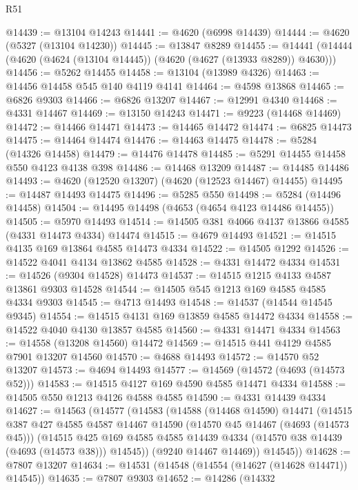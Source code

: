 \begin{lexlean}{R51}
\begin{coremodule}
@14439 := @13104 @14243
@14441 := @4620 (@6998 @14439)
@14444 := @4620 (@5327 (@13104 @14230))
@14445 := @13847 @8289
@14455 := @14441 (@14444 (@4620 (@4624 (@13104 @14445)) (@4620 (@4627 (@13933 @8289)) @4630)))
@14456 := @5262 @14455
@14458 := @13104 (@13989 @4326)
@14463 := @14456 @14458 @545 @140 @4119 @4141
@14464 := @4598 @13868
@14465 := @6826 @9303
@14466 := @6826 @13207
@14467 := @12991 @4340
@14468 := @4331 @14467
@14469 := @13150 @14243
@14471 := @9223 (@14468 @14469)
@14472 := @14466 @14471
@14473 := @14465 @14472
@14474 := @6825 @14473
@14475 := @14464 @14474
@14476 := @14463 @14475
@14478 := @5284 (@14326 @14458)
@14479 := @14476 @14478
@14485 := @5291 @14455 @14458 @550 @4123 @4138 @398
@14486 := @14468 @13209
@14487 := @14485 @14486
@14493 := @4620 (@12520 @13207) (@4620 (@12523 @14467) @14455)
@14495 := @14487 @14493 @14475
@14496 := @5285 @550
@14498 := @5284 (@14496 @14458)
@14504 := @14495 @14498 (@4653 (@4654 @4123 @14486 @14455))
@14505 := @5970 @14493
@14514 := @14505 @381 @4066 @4137 @13866 @4585 (@4331 @14473 @4334) @14474
@14515 := @4679 @14493
@14521 := @14515 @4135 @169 @13864 @4585 @14473 @4334
@14522 := @14505 @1292
@14526 := @14522 @4041 @4134 @13862 @4585
@14528 := @4331 @14472 @4334
@14531 := @14526 (@9304 @14528) @14473
@14537 := @14515 @1215 @4133 @4587 @13861 @9303 @14528
@14544 := @14505 @545 @1213 @169 @4585 @4585 @4334 @9303
@14545 := @4713 @14493
@14548 := @14537 (@14544 @14545 @9345)
@14554 := @14515 @4131 @169 @13859 @4585 @14472 @4334
@14558 := @14522 @4040 @4130 @13857 @4585
@14560 := @4331 @14471 @4334
@14563 := @14558 (@13208 @14560) @14472
@14569 := @14515 @441 @4129 @4585 @7901 @13207 @14560
@14570 := @4688 @14493
@14572 := @14570 @52 @13207
@14573 := @4694 @14493
@14577 := @14569 (@14572 (@4693 (@14573 @52)))
@14583 := @14515 @4127 @169 @4590 @4585 @14471 @4334
@14588 := @14505 @550 @1213 @4126 @4588 @4585
@14590 := @4331 @14439 @4334
@14627 := @14563
    (@14577
      (@14583
        (@14588
          (@14468 @14590)
          @14471
          (@14515
            @387
            @427
            @4585
            @4587
            @14467
            @14590
            (@14570 @45 @14467 (@4693 (@14573 @45)))
            (@14515
              @425
              @169
              @4585
              @4585
              @14439
              @4334
              (@14570 @38 @14439 (@4693 (@14573 @38)))
              @14545))
          (@9240 @14467 @14469))
        @14545))
@14628 := @7807 @13207
@14634 := @14531 (@14548 (@14554 (@14627 (@14628 @14471)) @14545))
@14635 := @7807 @9303
@14652 := @14286
    (@14332

\end{coremodule}
\end{lexlean}
